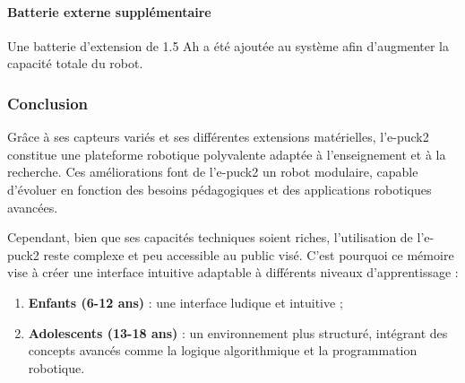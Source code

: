 \paragraph{Batterie externe supplémentaire}
Une batterie d'extension de 1.5 Ah a été ajoutée au système afin d'augmenter la capacité totale du robot.

\subsubsection{Conclusion}
Grâce à ses capteurs variés et ses différentes extensions matérielles, l'e-puck2 constitue une plateforme robotique polyvalente adaptée à l'enseignement et à la recherche.
Ces améliorations font de l'e-puck2 un robot modulaire, capable d'évoluer en fonction des besoins pédagogiques et des applications robotiques avancées.

Cependant, bien que ses capacités techniques soient riches, l'utilisation de l'e-puck2 reste complexe et peu accessible au public visé.
C'est pourquoi ce mémoire vise à créer une interface intuitive adaptable à différents niveaux d'apprentissage :
\begin{enumerate}
    \item \textbf{Enfants (6-12 ans)} : une interface ludique et intuitive ;
    \item \textbf{Adolescents (13-18 ans)} : un environnement plus structuré, intégrant des concepts avancés comme la logique algorithmique et la programmation robotique.
\end{enumerate}
